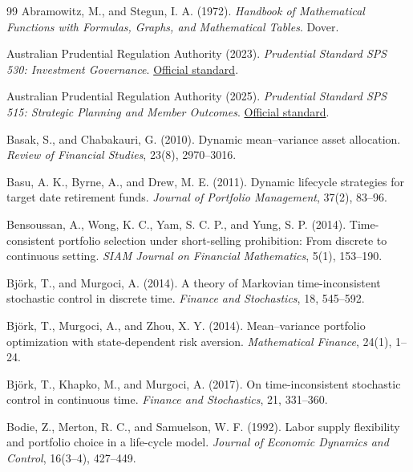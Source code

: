 \documentclass[10pt,a4paper]{article}
\theoremstyle{plain}
\theoremstyle{definition}
\begin{document}
\begingroup
\footnotesize
\setlength{\bibsep}{1pt}
\begin{thebibliography}{99}
\footnotesize
{}
Abramowitz, M., and Stegun, I. A. (1972).
\emph{Handbook of Mathematical Functions with Formulas, Graphs, and Mathematical Tables}.
Dover.

Australian Prudential Regulation Authority (2023).
\emph{Prudential Standard SPS 530: Investment Governance}.
\href{https://www.apra.gov.au/standards/sps-530}{Official standard}.

Australian Prudential Regulation Authority (2025).
\emph{Prudential Standard SPS 515: Strategic Planning and Member Outcomes}.
\href{https://www.apra.gov.au/standards/sps-515}{Official standard}.

Basak, S., and Chabakauri, G. (2010).
Dynamic mean--variance asset allocation.
\emph{Review of Financial Studies}, 23(8), 2970--3016.

Basu, A. K., Byrne, A., and Drew, M. E. (2011).
Dynamic lifecycle strategies for target date retirement funds.
\emph{Journal of Portfolio Management}, 37(2), 83--96.

Bensoussan, A., Wong, K. C., Yam, S. C. P., and Yung, S. P. (2014).
Time-consistent portfolio selection under short-selling prohibition: From discrete to continuous setting.
\emph{SIAM Journal on Financial Mathematics}, 5(1), 153--190.

Björk, T., and Murgoci, A. (2014).
A theory of Markovian time-inconsistent stochastic control in discrete time.
\emph{Finance and Stochastics}, 18, 545--592.

Björk, T., Murgoci, A., and Zhou, X. Y. (2014).
Mean--variance portfolio optimization with state-dependent risk aversion.
\emph{Mathematical Finance}, 24(1), 1--24.

Björk, T., Khapko, M., and Murgoci, A. (2017).
On time-inconsistent stochastic control in continuous time.
\emph{Finance and Stochastics}, 21, 331--360.

Bodie, Z., Merton, R. C., and Samuelson, W. F. (1992).
Labor supply flexibility and portfolio choice in a life-cycle model.
\emph{Journal of Economic Dynamics and Control}, 16(3--4), 427--449.


\end{thebibliography}
\end{document}

